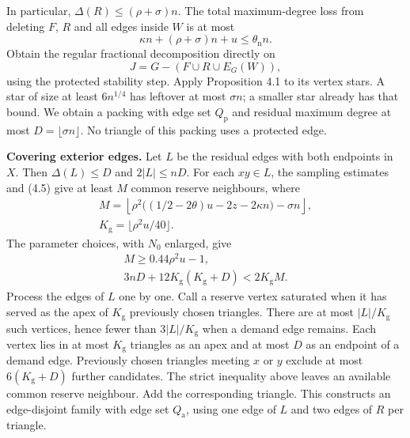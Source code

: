 \documentclass[english,11pt,a4paper]{article}
\begin{document}
In particular, \(\Delta(R)\le(\rho+\sigma)n\). The total maximum-degree loss from deleting \(F\), \(R\) and all edges inside \(W\) is at most \[\kappa n+(\rho+\sigma)n+u\le\theta_{\mathrm n}n.\] Obtain the regular fractional decomposition directly on \[J=G-(F\cup R\cup E_G(W)),
\tag{A.4}\] using the protected stability step. Apply Proposition 4.1 to its vertex stars. A star of size at least \(6n^{1/4}\) has leftover at most \(\sigma n\); a smaller star already has that bound. We obtain a packing with edge set \(Q_{\mathrm p}\) and residual maximum degree at most \(D=\lfloor\sigma n\rfloor\). No triangle of this packing uses a protected edge.

\textbf{Covering exterior edges.} Let \(L\) be the residual edges with both endpoints in \(X\). Then \(\Delta(L)\le D\) and \(2|L|\le nD\). For each \(xy\in L\), the sampling estimates and (4.5) give at least \(M\) common reserve neighbours, where \[\begin{gathered}
M=\left\lfloor
\rho^2\bigl((1/2-2\theta)u-2z-2\kappa n\bigr)-\sigma n
\right\rfloor,\\
K_{\mathrm g}=\lfloor\rho^2u/40\rfloor.
\end{gathered}\] The parameter choices, with \(N_0\) enlarged, give \[\begin{gathered}
M\ge0.44\rho^2u-1,\\
3nD+12K_{\mathrm g}(K_{\mathrm g}+D)<2K_{\mathrm g}M.
\end{gathered}\] Process the edges of \(L\) one by one. Call a reserve vertex saturated when it has served as the apex of \(K_{\mathrm g}\) previously chosen triangles. There are at most \(|L|/K_{\mathrm g}\) such vertices, hence fewer than \(3|L|/K_{\mathrm g}\) when a demand edge remains. Each vertex lies in at most \(K_{\mathrm g}\) triangles as an apex and at most \(D\) as an endpoint of a demand edge. Previously chosen triangles meeting \(x\) or \(y\) exclude at most \(6(K_{\mathrm g}+D)\) further candidates. The strict inequality above leaves an available common reserve neighbour. Add the corresponding triangle. This constructs an edge-disjoint family with edge set \(Q_{\mathrm a}\), using one edge of \(L\) and two edges of \(R\) per triangle.
\end{document}
